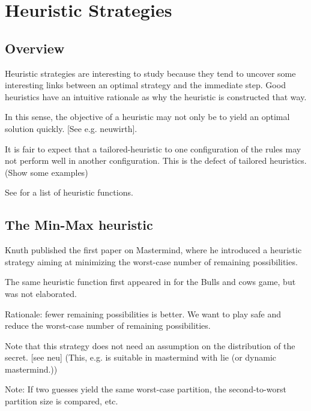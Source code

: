 \section{Heuristic Strategies}


\subsection{Overview}

Heuristic strategies are interesting to study because they tend to uncover some interesting links between an optimal strategy and the immediate step. Good heuristics have an intuitive rationale as why the heuristic is constructed that way.

In this sense, the objective of a heuristic may not only be to yield an optimal solution quickly. [See e.g. neuwirth].

It is fair to expect that a tailored-heuristic to one configuration of the rules may not perform well in another configuration. This is the defect of tailored heuristics. (Show some examples)

See \cite{pepperdine10} for a list of heuristic functions.

\subsection{The Min-Max heuristic}

Knuth \cite{knuth76} published the first paper on Mastermind, where he introduced a heuristic strategy aiming at minimizing the worst-case number of remaining possibilities.

The same heuristic function first appeared in \cite{aleph71} for the Bulls and cows game, but was not elaborated.

Rationale: fewer remaining possibilities is better. We want to play safe and reduce the worst-case number of remaining possibilities. 

Note that this strategy does not need an assumption on the distribution of the secret. [see neu] (This, e.g. is suitable in mastermind with lie (or dynamic mastermind.))

Note: If two guesses yield the same worst-case partition, the second-to-worst partition size is compared, etc.

